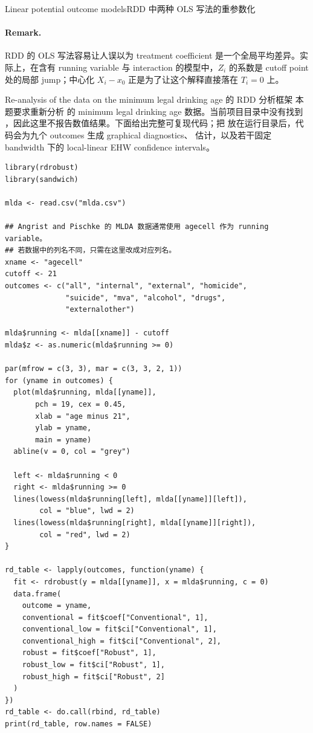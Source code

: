 \begin{exercisesolution}{Linear potential outcome models}{RDD 中两种 OLS 写法的重参数化}
\paragraph{Remark.}
RDD 的 OLS 写法容易让人误以为 treatment coefficient 是一个全局平均差异。实际上，在含有 running variable 与 interaction 的模型中，$Z_i$ 的系数是 cutoff point 处的局部 jump；中心化 $X_i-x_0$ 正是为了让这个解释直接落在 $T_i=0$ 上。
\end{exercisesolution}

\begin{exercisesolution}{Re-analysis of the data on the minimum legal drinking age}{ 的 RDD 分析框架}
本题要求重新分析 \citet{carpenter2009effect} 的 minimum legal drinking age 数据。当前项目目录中没有找到 ，因此这里不报告数值结果。下面给出完整可复现代码；把  放在运行目录后，代码会为九个 outcomes 生成 graphical diagnostics、 估计，以及若干固定 bandwidth 下的 local-linear EHW confidence intervals。

\begin{lstlisting}
library(rdrobust)
library(sandwich)

mlda <- read.csv("mlda.csv")

## Angrist and Pischke 的 MLDA 数据通常使用 agecell 作为 running variable。
## 若数据中的列名不同，只需在这里改成对应列名。
xname <- "agecell"
cutoff <- 21
outcomes <- c("all", "internal", "external", "homicide",
              "suicide", "mva", "alcohol", "drugs",
              "externalother")

mlda$running <- mlda[[xname]] - cutoff
mlda$z <- as.numeric(mlda$running >= 0)

par(mfrow = c(3, 3), mar = c(3, 3, 2, 1))
for (yname in outcomes) {
  plot(mlda$running, mlda[[yname]],
       pch = 19, cex = 0.45,
       xlab = "age minus 21",
       ylab = yname,
       main = yname)
  abline(v = 0, col = "grey")

  left <- mlda$running < 0
  right <- mlda$running >= 0
  lines(lowess(mlda$running[left], mlda[[yname]][left]),
        col = "blue", lwd = 2)
  lines(lowess(mlda$running[right], mlda[[yname]][right]),
        col = "red", lwd = 2)
}

rd_table <- lapply(outcomes, function(yname) {
  fit <- rdrobust(y = mlda[[yname]], x = mlda$running, c = 0)
  data.frame(
    outcome = yname,
    conventional = fit$coef["Conventional", 1],
    conventional_low = fit$ci["Conventional", 1],
    conventional_high = fit$ci["Conventional", 2],
    robust = fit$coef["Robust", 1],
    robust_low = fit$ci["Robust", 1],
    robust_high = fit$ci["Robust", 2]
  )
})
rd_table <- do.call(rbind, rd_table)
print(rd_table, row.names = FALSE)


\end{lstlisting}
\end{exercisesolution}
